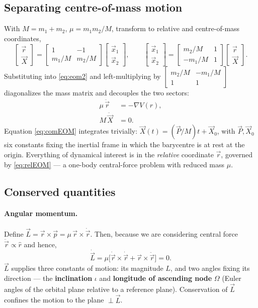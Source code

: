 \documentclass[11pt]{article}
\newcommand{\vecr}{\vec r}
\newcommand{\vecL}{\vec L}
\newcommand{\vecp}{\vec p}
\newcommand{\vecx}{\vec x}
\begin{document}
\subsection{Separating centre-of-mass motion}
With $M=m_1+m_2$, $\mu = m_1m_2/M$, transform to relative and centre-of-mass coordinates,
\[
\begin{bmatrix}\vecr\\ \vec X\end{bmatrix}=\begin{bmatrix}1&-1\\ m_1/M& m_2/M\end{bmatrix}\begin{bmatrix}\vecx_1\\\vecx_2\end{bmatrix},
\qquad
\begin{bmatrix}\vecx_1\\\vecx_2\end{bmatrix}=\begin{bmatrix}m_2/M&1\\-m_1/M&1\end{bmatrix}\begin{bmatrix}\vecr\\\vec X\end{bmatrix}.
\]
Substituting into \eqref{eq:eom2} and left-multiplying by $\begin{bmatrix}m_2/M&-m_1/M\\1&1\end{bmatrix}$ diagonalizes the mass matrix and decouples the two sectors:
\begin{align}
\mu\,\ddot{\vecr} &= -\nabla V(r), \label{eq:relEOM}\\
M\,\ddot{\vec X} &= 0. \label{eq:comEOM}
\end{align}
Equation \eqref{eq:comEOM} integrates trivially: $\vec X(t) = (\vec P/M)t+\vec X_0$, with $\vec P,\vec X_0$ six constants fixing the inertial frame in which the barycentre is at rest at the origin. Everything of dynamical interest is in the \emph{relative} coordinate $\vecr$, governed by \eqref{eq:relEOM} — a one-body central-force problem with reduced mass $\mu$.

\subsection{Conserved quantities}

\paragraph{Angular momentum.} Define $\vecL=\vecr\times\vecp=\mu\,\vecr\times\dot{\vecr}$. Then, because we are considering central force $\ddot{\vec r}\propto \hat{r}$ and hence,
\[
\dot{\vecL} = \mu\big[\dot{\vecr}\times\dot{\vecr}+\vecr\times\ddot{\vecr}\big]=0.
\]
$\vecL$ supplies three constants of motion: its magnitude $L$, and two angles fixing its direction — the \textbf{inclination} $\iota$ and \textbf{longitude of ascending node} $\Omega$ (Euler angles of the orbital plane relative to a reference plane). Conservation of $\vecL$ confines the motion to the plane $\perp\vecL$.
	
\end{document}
